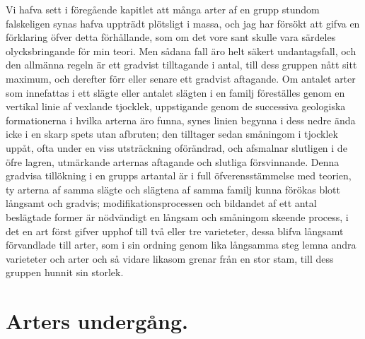 Vi hafva sett i föregående kapitlet att många arter af en grupp stundom falskeligen synas hafva uppträdt plötsligt i massa, och jag har försökt att gifva en förklaring öfver detta förhållande, som om det vore sant skulle vara särdeles olycksbringande för min teori. Men sådana fall äro helt säkert undantagsfall, och den allmänna regeln är ett gradvist tilltagande i antal, till dess gruppen nått sitt maximum, och derefter förr eller senare ett gradvist aftagande. Om antalet arter som innefattas i ett slägte eller antalet slägten i en familj föreställes genom en vertikal linie af vexlande tjocklek, uppstigande genom de successiva geologiska formationerna i hvilka arterna äro funna, synes linien begynna i dess nedre ända icke i en skarp spets utan afbruten; den tilltager sedan småningom i tjocklek uppåt, ofta under en viss utsträckning oförändrad, och afsmalnar slutligen i de öfre lagren, utmärkande arternas aftagande och slutliga försvinnande. Denna gradvisa tillökning i en grupps artantal är i full öfverensstämmelse med teorien, ty arterna af samma slägte och slägtena af samma familj kunna förökas blott långsamt och gradvis; modifikationsprocessen och bildandet af ett antal beslägtade former är nödvändigt en långsam och småningom skeende process, i det en art först gifver upphof till två eller tre varieteter, dessa blifva långsamt förvandlade till arter, som i sin ordning genom lika långsamma steg lemna andra varieteter och arter och så vidare likasom grenar från en stor stam, till dess gruppen hunnit sin storlek.

\section{Arters undergång.}


